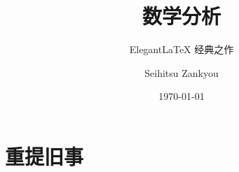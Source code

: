 \documentclass[lang=cn,10pt]{elegantbook}
\title{数学分析}
\subtitle{Elegant\LaTeX{} 经典之作}
\author{Seihitsu Zankyou}
\institute{Elegant\LaTeX{} Program}
\date{\today}
\begin{document}
\maketitle
\frontmatter

\tableofcontents

\mainmatter

\part{重提旧事}\label{part:introduction}
	\parttoc
	
	
	
	
	

	
	
	
	
	
	
	
	
	

	\appendix

\backmatter
\end{document}
